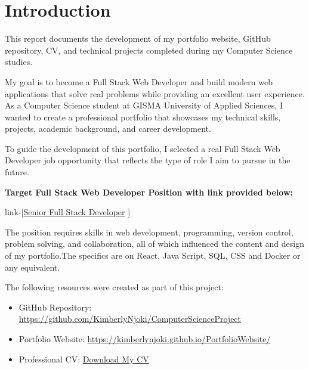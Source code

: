 \documentclass[12pt,a4paper]{article}
\begin{document}
\vspace{1cm}

\tableofcontents


\clearpage

\section{Introduction}
\begin{tcolorbox}[
colback=KimPink!5,
colframe=KimPink,
title=About This Report]

This report documents the development of my portfolio website, GitHub repository, CV, and technical projects completed during my Computer Science studies.

\end{tcolorbox}

My goal is to become a Full Stack Web Developer and build modern web applications that solve real problems while providing an excellent user experience. As a Computer Science student at GISMA University of Applied Sciences, I wanted to create a professional portfolio that showcases my technical skills, projects, academic background, and career development.

To guide the development of this portfolio, I selected a real Full Stack Web Developer job opportunity that reflects the type of role I aim to pursue in the future.






\textbf{Target Full Stack Web Developer Position with link provided below:}

link-[\href{https://www.linkedin.com/jobs/view/4419844638/?trackingId=PuSz2FWbfsMHEbID0iAecQ%3D%3D&refId=HBHbjzF3obmvOUfJKJ%2FX3A%3D%3D&eBP=NON_CHARGEABLE_CHANNEL&alternateChannel=search&isJobSearch=false&lipi=urn%3Ali%3Apage%3Ad_flagship3_nlsearch_srp_jobs%3B98OjX5xtQEyA8qJpKWoasw%3D%3D}{Senior Full Stack Developer} ]

The position requires skills in web development, programming, version control, problem solving, and collaboration, all of which influenced the content and design of my portfolio.The specifics are on React, Java Script, SQL, CSS and Docker or any equivalent.

The following resources were created as part of this project:

\begin{itemize}
\item GitHub Repository: \url{https://github.com/KimberlyNjoki/ComputerScienceProject}
\item Portfolio Website: \url{https://kimberlynjoki.github.io/PortfolioWebsite/}

\item Professional CV:
\href{https://raw.githubusercontent.com/KimberlyNjoki/ComputerScienceProject/main/LaTeXCV/LatexCV.pdf}{Download My CV}
\end{itemize}
\end{document}
